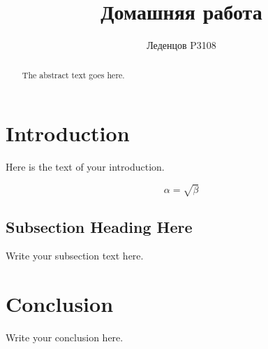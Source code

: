 \documentclass{article}
\begin{document}
\title{Домашняя работа}

\author{Леденцов P3108}
\maketitle

\begin{abstract}
The abstract text goes here.
\end{abstract}

\section{Introduction}
Here is the text of your introduction.

\begin{equation}
    \label{simple_equation}
    \alpha = \sqrt{ \beta }
\end{equation}

\subsection{Subsection Heading Here}
Write your subsection text here.

\section{Conclusion}
Write your conclusion here.
\end{document}
